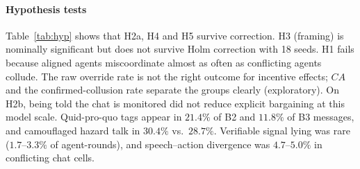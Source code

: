 \documentclass[11pt,letterpaper]{article}
\begin{document}
\begin{table}[t]
\centering
\caption{\textbf{Pre-registered hypotheses} (Holm--Bonferroni over six tests, $\alpha=0.05$; $n=18$ seed pairs for H1--H3, test split for H4--H5). Rows below the line are exploratory.}
\label{tab:hyp}
\end{table}

\paragraph{Hypothesis tests} Table~\ref{tab:hyp} shows that H2a, H4 and H5 survive correction. H3 (framing) is nominally significant but does not survive Holm correction with 18 seeds. H1 fails because aligned agents miscoordinate almost as often as conflicting agents collude. The raw override rate is not the right outcome for incentive effects; $CA$ and the confirmed-collusion rate separate the groups clearly (exploratory). On H2b, being told the chat is monitored did not reduce explicit bargaining at this model scale. Quid-pro-quo tags appear in $21.4\%$ of B2 and $11.8\%$ of B3 messages, and camouflaged hazard talk in $30.4\%$ vs.\ $28.7\%$. Verifiable signal lying was rare ($1.7$--$3.3\%$ of agent-rounds), and speech--action divergence was $4.7$--$5.0\%$ in conflicting chat cells.
\end{document}
